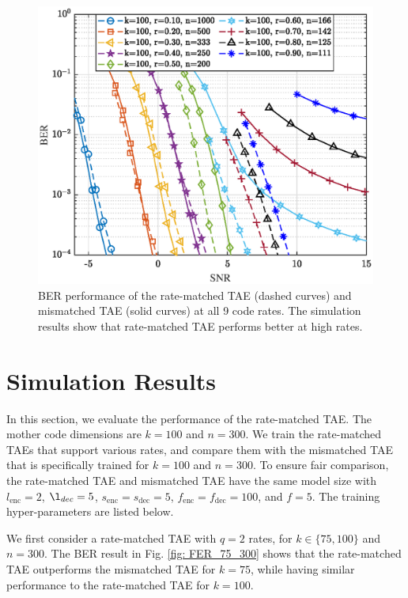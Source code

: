 \documentclass [PhD] {uclathes}
\begin{document}
\begin{figure}[t] 
    \centering
      \includegraphics[width=0.5\linewidth]{figures/BER_size_1.eps}
      \caption{BER performance of the rate-matched TAE (dashed curves) and mismatched TAE (solid curves)  at all 9 code rates. The simulation results show that rate-matched TAE performs better at high rates.}
     \label{fig: BER_size_1}
\end{figure}

\section{Simulation Results}\label{sec: simulation}
%
In this section, we evaluate the performance of the rate-matched TAE. The mother code dimensions are $k=100$ and $n=300$. We train the rate-matched TAEs that support various rates, and compare them with the mismatched TAE that is specifically trained for $k=100$ and $n=300$. To ensure fair comparison, the rate-matched TAE and mismatched TAE have the same model size with $l_{\text{enc}}=2$, $\l_{dec}=5$, 
$s_{\text{enc}}=s_{\text{dec}}=5$, $f_{\text{enc}}=f_{\text{dec}}=100$, and $f=5$. The training hyper-parameters are listed below.


We first consider a rate-matched TAE with $q=2$ rates, for $k\in\{75,100\}$ and $n=300$. The BER result in  Fig. \ref{fig: FER_75_300} shows that the rate-matched TAE outperforms the mismatched TAE for $k=75$, while having similar performance to the rate-matched TAE for $k=100$. 
\end{document}
